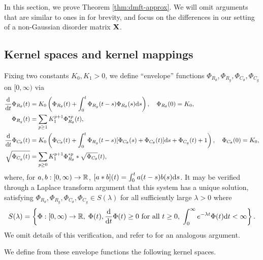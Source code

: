 In this section, we prove Theorem \ref{thm:dmft-approx}. We will omit arguments that are similar to ones in \cite{fan2025dynamicalI} for brevity, and focus on the differences in our setting of a non-Gaussian disorder matrix $\mathbf{X}$.

\subsection{Kernel spaces and kernel mappings}\label{subsec:spaces}

Fixing two constants $K_0,K_1>0$, we define ``envelope'' functions 
$\Phi_{R_\theta},\Phi_{R_g},\Phi_{C_\theta},\Phi_{C_g}$ on $[0,\infty)$ via
\begin{align}
\frac{\mathrm{d}}{\mathrm{d} t}\Phi_{R_\theta}(t) &= K_0\left(\Phi_{R_\theta}(t) + \int_0^t
\Phi_{R_g}(t-s)\Phi_{R_\theta}(s)\mathrm{d} s\right), \quad
\Phi_{R_\theta}(0)=K_0,\label{eq:envelope-R-theta}\\
\Phi_{R_g}(t) &= \sum_{p \geq 1} K_1^{p+1} \Phi_{R_\theta}^{\ast p}(t), \label{eq:envelope-R-g}\\
\frac{\mathrm{d}}{\mathrm{d} t}\Phi_{C_\theta}(t) &= K_0\left(\Phi_{C_\theta}(t)
+\int_0^t \Phi_{R_g}(t-s)[\Phi_{C_\theta}(s)+\Phi_{C_\theta}(t)]\mathrm{d} s
+ \Phi_{C_g}(t)+1\right), \quad
\Phi_{C_\theta}(0)=K_0,\label{eq:envelope-C-theta}\\
\sqrt{\Phi_{C_g}(t)} &= \sum_{p \geq 0} K_1^{p+1} \Phi_{R_\theta}^{\ast p} \ast
\sqrt{\Phi_{C_\theta}}(t),\label{eq:envelope-C-g}
\end{align}
where, for $a,b:[0,\infty) \to \mathbb{R}$, $[a*b](t)=\int_0^t a(t-s)b(s)\mathrm{d} s$.
It may be verified through a Laplace transform argument that 
this system has a unique solution, satisfying 
$\Phi_{R_\theta},\Phi_{R_g},\Phi_{C_\theta},\Phi_{C_g} \in S(\lambda)$ 
for all sufficiently large $\lambda>0$ where
\[
  S(\lambda)=
  \left\{
    \Phi:[0,\infty)\to \mathbb{R},\;\Phi(t),\frac{\mathrm{d}}{\mathrm{d} t}\Phi(t) \geq 0 \text{ for all } t \geq 0,\;
    \int_0^\infty e^{-\lambda t}\Phi(t)\mathrm{d} t<\infty
  \right\}.
\]
We omit details of this verification, and refer to
\cite[Lemma 3.1]{fan2025dynamicalI} for an analogous argument.

We define from these envelope functions the following kernel spaces.


